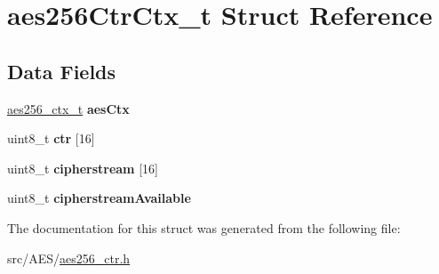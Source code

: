 \hypertarget{structaes256_ctr_ctx__t}{\section{aes256\+Ctr\+Ctx\+\_\+t Struct Reference}
\label{structaes256_ctr_ctx__t}
}
\subsection*{Data Fields}
\begin{DoxyCompactItemize}
\item 
\hypertarget{structaes256_ctr_ctx__t_a534622294f464c237dcab49728a897d4}{\hyperlink{structaes256__ctx__t}{aes256\+\_\+ctx\+\_\+t} {\bfseries aes\+Ctx}}\label{structaes256_ctr_ctx__t_a534622294f464c237dcab49728a897d4}

\item 
\hypertarget{structaes256_ctr_ctx__t_a5ff3a4c9ddefb040b9dabf2f939dd62a}{uint8\+\_\+t {\bfseries ctr} \mbox{[}16\mbox{]}}\label{structaes256_ctr_ctx__t_a5ff3a4c9ddefb040b9dabf2f939dd62a}

\item 
\hypertarget{structaes256_ctr_ctx__t_a0629c0a9d7eb57c8a2da94f78e1d08a4}{uint8\+\_\+t {\bfseries cipherstream} \mbox{[}16\mbox{]}}\label{structaes256_ctr_ctx__t_a0629c0a9d7eb57c8a2da94f78e1d08a4}

\item 
\hypertarget{structaes256_ctr_ctx__t_a37e06e9c77c1b2ee0bfc01d32cda6e38}{uint8\+\_\+t {\bfseries cipherstream\+Available}}\label{structaes256_ctr_ctx__t_a37e06e9c77c1b2ee0bfc01d32cda6e38}

\end{DoxyCompactItemize}


The documentation for this struct was generated from the following file\+:\begin{DoxyCompactItemize}
\item 
src/\+A\+E\+S/\hyperlink{aes256__ctr_8h}{aes256\+\_\+ctr.\+h}\end{DoxyCompactItemize}
